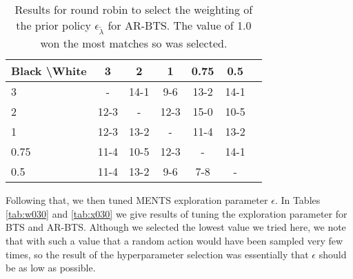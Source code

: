 \documentclass{article}
\theoremstyle{plain}
\begin{document}
\begin{appendices}
            \begin{table*}[]
            \centering
                \begin{tabular}{l|cccccc}
                    \textbf{Black \textbackslash White}     & 3  & 2   & 1   & 0.75    & 0.5    \\ 
                    \hline
                                            3            & - & 14-1 & 9-6 & 13-2 & 14-1   		\\
                                            2            & 12-3 & - & 12-3 & 15-0 & 10-5   		\\
                                            1          & 12-3 & 13-2 & - & 11-4 & 13-2   		\\
                                            0.75          & 11-4 & 10-5 & 12-3 & - & 14-1   		\\
                                            0.5         & 11-4 & 13-2 & 9-6 & 7-8 &   -   	\\   
                \end{tabular}
                \caption{Results for round robin to select the weighting of the prior policy $\epsilon_{\tilde{\lambda}}$ for AR-BTS. The value of 1.0 won the most matches so was selected. \label{tab:x020}}
            \end{table*}
            
            
            
            
            
            
            Following that, we then tuned MENTS exploration parameter $\epsilon$. In Tables \ref{tab:w030} and \ref{tab:x030} we give results of tuning the exploration parameter for BTS and AR-BTS. Although we selected the lowest value we tried here, we note that with such a value that a random action would have been sampled very few times, so the result of the hyperparameter selection was essentially that $\epsilon$ should be as low as possible.
            

\end{appendices}
\end{document}
